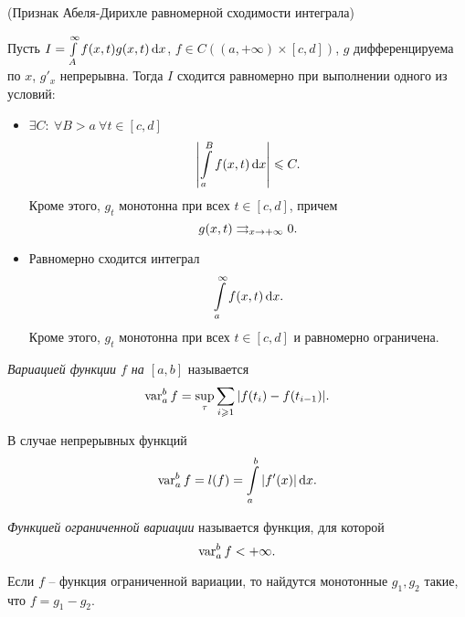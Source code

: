 \begin{theorem}(Признак Абеля-Дирихле равномерной сходимости интеграла)
    
    Пусть $I = \intl_A^\infty{f(x, t) g(x, t) \dd x}$, $f \in C((a, +\infty) \times
    [c, d])$, $g$ дифференцируема по $x$, $g'_x$ непрерывна. Тогда $I$ сходится
    равномерно при выполнении одного из условий:
    \begin{itemize}
        \item $\exists C\colon~ \forall B > a~ \forall t \in [c, d]$
            \[
                \abs*{\intl_a^B{f(x, t) \dd x}} \leqslant C
            .\]
            Кроме этого, $g_t$ монотонна при всех $t \in [c, d]$, причем
            \[
                g(x, t) \rcon_{x \to +\infty} 0
            .\]
        \item Равномерно сходится интеграл
            \[
                \intl_a^\infty{f(x, t) \dd x}
            .\]
            Кроме этого, $g_t$ монотонна при всех $t \in [c, d]$ и равномерно
            ограничена.
    \end{itemize}
\end{theorem}

\begin{definition}
    \textit{Вариацией функции $f$ на $[a, b]$} называется
    \[
        \var_a^b{f} = \sup_{\tau}{\sum_{i \geqslant 1}{|f(t_i) - f(t_{i - 1})|}}
    .\]
\end{definition}

\begin{remark}
    В случае непрерывных функций
    \[
        \var_a^b{f} = l(f) = \intl_a^b{|f'(x)| \dd x}
    .\]
\end{remark}

\begin{definition}
    \textit{Функцией ограниченной вариации} называется функция, для которой
    \[
        \var_a^b{f} < +\infty
    .\]
\end{definition}

\begin{remark}
    Если $f$ -- функция ограниченной вариации, то найдутся монотонные $g_1, g_2$
    такие, что $f = g_1 - g_2$.
\end{remark}

